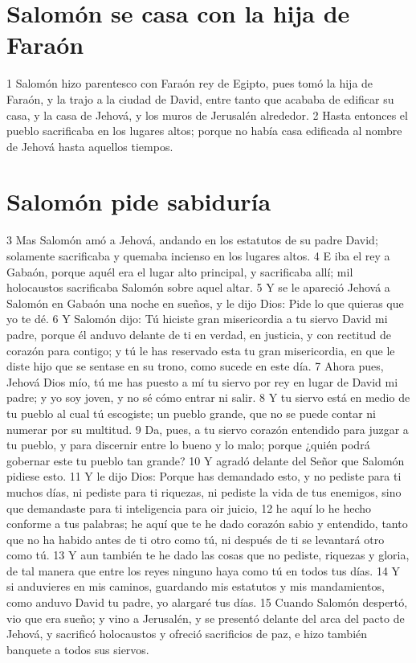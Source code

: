 \section*{Salomón se casa con la hija de Faraón}

1 Salomón hizo parentesco con Faraón rey de Egipto, pues tomó la hija de Faraón, y la trajo a la ciudad de David, entre tanto que acababa de edificar su casa, y la casa de Jehová, y los muros de Jerusalén alrededor.
2 Hasta entonces el pueblo sacrificaba en los lugares altos; porque no había casa edificada al nombre de Jehová hasta aquellos tiempos.

\section*{Salomón pide sabiduría}

3 Mas Salomón amó a Jehová, andando en los estatutos de su padre David; solamente sacrificaba y quemaba incienso en los lugares altos.
4 E iba el rey a Gabaón, porque aquél era el lugar alto principal, y sacrificaba allí; mil holocaustos sacrificaba Salomón sobre aquel altar.
5 Y se le apareció Jehová a Salomón en Gabaón una noche en sueños, y le dijo Dios: Pide lo que quieras que yo te dé.
6 Y Salomón dijo: Tú hiciste gran misericordia a tu siervo David mi padre, porque él anduvo delante de ti en verdad, en justicia, y con rectitud de corazón para contigo; y tú le has reservado esta tu gran misericordia, en que le diste hijo que se sentase en su trono, como sucede en este día.
7 Ahora pues, Jehová Dios mío, tú me has puesto a mí tu siervo por rey en lugar de David mi padre; y yo soy joven, y no sé cómo entrar ni salir.
8 Y tu siervo está en medio de tu pueblo al cual tú escogiste; un pueblo grande, que no se puede contar ni numerar por su multitud.
9 Da, pues, a tu siervo corazón entendido para juzgar a tu pueblo, y para discernir entre lo bueno y lo malo; porque ¿quién podrá gobernar este tu pueblo tan grande?
10 Y agradó delante del Señor que Salomón pidiese esto.
11 Y le dijo Dios: Porque has demandado esto, y no pediste para ti muchos días, ni pediste para ti riquezas, ni pediste la vida de tus enemigos, sino que demandaste para ti inteligencia para oir juicio,
12 he aquí lo he hecho conforme a tus palabras; he aquí que te he dado corazón sabio y entendido, tanto que no ha habido antes de ti otro como tú, ni después de ti se levantará otro como tú.
13 Y aun también te he dado las cosas que no pediste, riquezas y gloria, de tal manera que entre los reyes ninguno haya como tú en todos tus días.
14 Y si anduvieres en mis caminos, guardando mis estatutos y mis mandamientos, como anduvo David tu padre, yo alargaré tus días.
15 Cuando Salomón despertó, vio que era sueño; y vino a Jerusalén, y se presentó delante del arca del pacto de Jehová, y sacrificó holocaustos y ofreció sacrificios de paz, e hizo también banquete a todos sus siervos.

